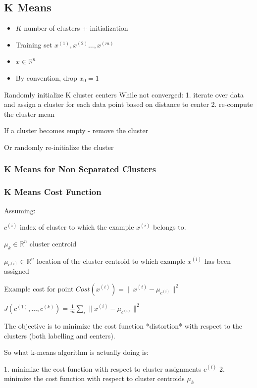 \subsection{K Means}

\begin{itemize}
\item $K$ number of clusters + initialization
\item Training set ${x^{(1)},x^{(2)}\dots,x^{(m)}}$
\item $x\in\mathbb{R}^n$
\item By convention, drop $x_0=1$
\end{itemize}

Randomly initialize K cluster centers
While not converged:
1. iterate over data and assign a cluster for each data point based on distance to center
2. re-compute the cluster mean

If a cluster becomes empty - remove the cluster

Or randomly re-initialize the cluster

\subsubsection{K Means for Non Separated Clusters}

\subsubsection{K Means Cost Function}

Assuming: 

$c^{(i)}$ index of cluster to which the example $x^{(i)}$ belongs to.

$\mu_k \in \mathbb R ^n $ cluster centroid 

$\mu_{c^{(i)}} \in \mathbb R ^n $ location of the cluster centroid to which example $x^{(i)}$ has been assigned

Example cost for point $Cost(x^{(i)}) = \|x^{(i)} - \mu_{c^{(i)}} \|^2$ 

$J(c^{(1)},\dots, c^{(k)})= \frac{1}{m}\sum_i \|x^{(i)} - \mu_{c^{(i)}} \|^2 $

The objective is to minimize the cost function *distortion* with respect to the clusters (both labelling and centers).

So what k-means algorithm is actually doing is:

1. minimize the cost function with respect to cluster assignments $c^{(i)}$
2. minimize the cost function with respect to cluster centroids $\mu_k$ 

